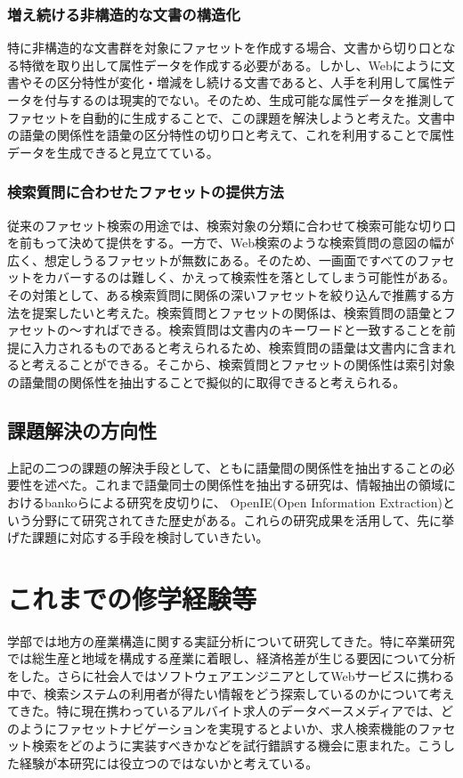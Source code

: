 \documentclass[a4j,10pt, twocolumn]{jarticle}
\begin{document}
\subsubsection{増え続ける非構造的な文書の構造化}
 特に非構造的な文書群を対象にファセットを作成する場合、文書から切り口となる特徴を取り出して属性データを作成する必要がある。しかし、Webにように文書やその区分特性が変化・増減をし続ける文書であると、人手を利用して属性データを付与するのは現実的でない。そのため、生成可能な属性データを推測してファセットを自動的に生成することで、この課題を解決しようと考えた。文書中の語彙の関係性を語彙の区分特性の切り口と考えて、これを利用することで属性データを生成できると見立てている。
\subsubsection{検索質問に合わせたファセットの提供方法}
従来のファセット検索の用途では、検索対象の分類に合わせて検索可能な切り口を前もって決めて提供をする。一方で、Web検索のような検索質問の意図の幅が広く、想定しうるファセットが無数にある。そのため、一画面ですべてのファセットをカバーするのは難しく、かえって検索性を落としてしまう可能性がある。その対策として、ある検索質問に関係の深いファセットを絞り込んで推薦する方法を提案したいと考えた。検索質問とファセットの関係は、検索質問の語彙とファセットの〜すればできる。検索質問は文書内のキーワードと一致することを前提に入力されるものであると考えられるため、検索質問の語彙は文書内に含まれると考えることができる。そこから、検索質問とファセットの関係性は索引対象の語彙間の関係性を抽出することで擬似的に取得できると考えられる。

\subsection{課題解決の方向性}
上記の二つの課題の解決手段として、ともに語彙間の関係性を抽出することの必要性を述べた。これまで語彙同士の関係性を抽出する研究は、情報抽出の領域におけるbankoらによる研究\cite{banko}を皮切りに、 OpenIE(Open Information Extraction)という分野にて研究されてきた歴史がある\cite{niklaus}。これらの研究成果を活用して、先に挙げた課題に対応する手段を検討していきたい。

\section{これまでの修学経験等}
 学部では地方の産業構造に関する実証分析について研究してきた。特に卒業研究では総生産と地域を構成する産業に着眼し、経済格差が生じる要因について分析をした。さらに社会人ではソフトウェアエンジニアとしてWebサービスに携わる中で、検索システムの利用者が得たい情報をどう探索しているのかについて考えてきた。特に現在携わっているアルバイト求人のデータベースメディアでは、どのようにファセットナビゲーションを実現するとよいか、求人検索機能のファセット検索をどのように実装すべきかなどを試行錯誤する機会に恵まれた。こうした経験が本研究には役立つのではないかと考えている。
\end{document}
